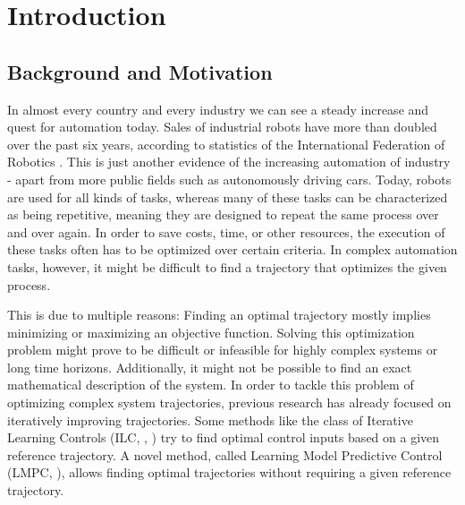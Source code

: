 \chapter{Introduction}
\section{Background and Motivation}
In almost every country and every industry we can see a steady increase and quest for automation today. Sales of industrial robots have more than doubled over the past six years, according to statistics of the International Federation of Robotics \cite{IFR2016}. This is just another evidence of the increasing automation of industry - apart from more public fields such as autonomously driving cars. Today, robots are used for all kinds of tasks, whereas many of these tasks can be characterized as being repetitive, meaning they are designed to repeat the same process over and over again. In order to save costs, time, or other resources, the execution of these tasks often has to be optimized over certain criteria. In complex automation tasks, however, it might be difficult to find a trajectory that optimizes the given process.

This is due to multiple reasons: Finding an optimal trajectory mostly implies minimizing or maximizing an objective function. Solving this optimization problem might prove to be difficult or infeasible for highly complex systems or long time horizons. Additionally, it might not be possible to find an exact mathematical description of the system.
In order to tackle this problem of optimizing complex system trajectories, previous research has already focused on iteratively improving trajectories. Some methods like the class of Iterative Learning Controls (ILC, \cite{Lee2007}, \cite{Bristow2006}) try to find optimal control inputs based on a given reference trajectory. A novel method, called Learning Model Predictive Control (LMPC, \cite{Rosolia2016}), allows finding optimal trajectories without requiring a given reference trajectory.


